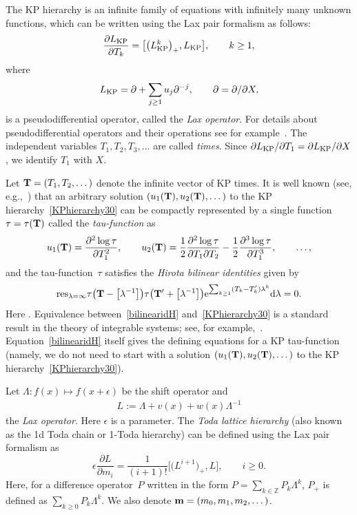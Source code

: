 \documentclass[pdftex]{sigma}
\newcommand{\e}{\epsilon}
\newcommand{\ZZ}{\mathbb{Z}}
\newcommand{\p}{\partial}
\newcommand{\beq}{\begin{equation}}
\newcommand{\eeq}{\end{equation}}
\numberwithin{equation}{section}
\begin{document}
The KP hierarchy is an infinite family of equations with infinitely many unknown functions,
which can be written using the Lax pair formalism as follows:
\beq\label{KPhierarchy30}
\frac{\p L_{\rm KP}}{\p T_k} = \bigl[\bigl(L_{\rm KP}^k\bigr)_+, L_{\rm KP}\bigr], \qquad k\ge1,
\eeq
where
\[
L_{\rm KP} = \p + \sum_{j\ge1} u_j \p^{-j}, \qquad \p=\p/\p X,
\]
is a pseudodifferential operator, called the {\it Lax operator}.
For details about pseudodifferential operators and their operations see for example~\cite{Dickey}.
The independent variables $T_1,T_2,T_3,\dots$ are called {\it times}.
Since $\p L_{\rm KP}/\p T_1 = \p L_{\rm KP}/\p X$, we identify $T_1$ with $X$.

Let ${\bf T}=(T_1,T_2,\dots)$ denote the infinite vector of KP times.
It is well known (see, e.g.,~\cite{Dickey}) that an arbitrary solution $(u_1({\bf T}), u_2({\bf T}),\dots)$
to the KP hierarchy~\eqref{KPhierarchy30} can be compactly represented by a single function $\tau=\tau({\bf T})$
called the {\it tau-function} as
\[
u_1({\bf T}) = \frac{\p^2 \log \tau}{\p T_1^2}, \qquad u_2({\bf T}) = \frac12 \frac{\p^2 \log \tau}{\p T_1 \p T_2} - \frac12 \frac{\p^3 \log \tau}{\p T_1^3}, \qquad \dots,
\]
and the tau-function~$\tau$ satisfies the {\it Hirota bilinear identities} given by
\beq\label{bilinearidH}
{\rm res}_{\lambda=\infty} \tau\bigl({\bf T} - \bigl[\lambda^{-1}\bigr]\bigr) \tau\bigl({\bf T'} + \bigl[\lambda^{-1}\bigr]\bigr) {\rm e}^{\sum_{k\ge1} (T_k-T_k') \lambda^k} {\rm d}\lambda=0.
\eeq
Here .
Equivalence between~\eqref{bilinearidH} and~\eqref{KPhierarchy30} is a standard result in the theory of integrable systems; see, for example,~\cite{Dickey}.
Equation~\eqref{bilinearidH} itself gives the defining equations for a KP tau-function (namely, we do not
 need to start with a solution $(u_1({\bf T}), u_2({\bf T}),\dots)$ to the KP hierarchy~\eqref{KPhierarchy30}).

Let $\Lambda\colon f(x)\mapsto f(x+\e)$ be the shift operator and
\begin{gather*}%
L := \Lambda + v(x) + w(x) \Lambda^{-1}
\end{gather*}
the {\it Lax operator}. Here $\e$ is a parameter.
The {\it Toda lattice hierarchy} (also known as the 1d Toda chain or 1-Toda hierarchy)
can be defined using the Lax pair formalism as
\beq\label{TLH}
\e\frac{\p L}{\p m_i} = \frac1{(i+1)!} \bigl[\bigl(L^{i+1}\bigr)_+,L\bigr], \qquad i\geq0.
\eeq
Here, for a difference operator~$P$ written in the form $P=\sum_{k\in \ZZ} P_k \Lambda^k$,
$P_+$ is defined as $\sum_{k\geq0} P_k \Lambda^k$. We also denote ${\bf m}=(m_0,m_1,m_2,\dots)$.
\end{document}
